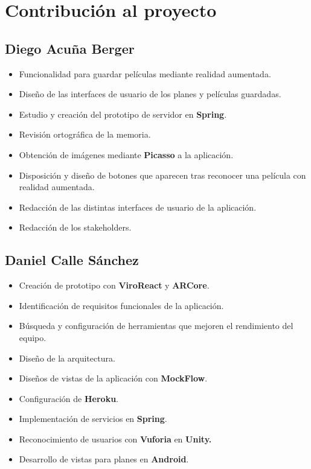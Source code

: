 
\cleardoublepage


\chapter{Contribución al proyecto}
\label{makereference7}

\section{Diego Acuña Berger}
\label{makereference7.1}
\begin{itemize}
    \item Funcionalidad para guardar películas mediante realidad aumentada.
    \item Diseño de las interfaces de usuario de los planes y películas guardadas.  
    \item Estudio y creación del prototipo de servidor en \textbf{Spring}.
    \item Revisión ortográfica de la memoria.
    \item Obtención de imágenes mediante \textbf{Picasso} a la aplicación.
    \item Disposición y diseño de botones que aparecen tras reconocer una película con realidad aumentada.
    \item Redacción de las distintas interfaces de usuario de la aplicación.
    \item Redacción de los stakeholders.
\end{itemize}
\section{Daniel Calle Sánchez}
\label{makereference7.2}
\begin{itemize}  
    \item Creación de prototipo con \textbf{ViroReact} y \textbf{ARCore}.
    \item Identificación de requisitos funcionales de la aplicación.
    \item Búsqueda y configuración de herramientas que mejoren el rendimiento del equipo.
    \item Diseño de la arquitectura.
    \item Diseños de vistas de la aplicación con \textbf{MockFlow}.
    \item Configuración de \textbf{Heroku}.
    \item Implementación de servicios en \textbf{Spring}.
    \item Reconocimiento de usuarios con \textbf{Vuforia} en \textbf{Unity.}
    \item Desarrollo de vistas para planes en \textbf{Android}.
\end{itemize}

